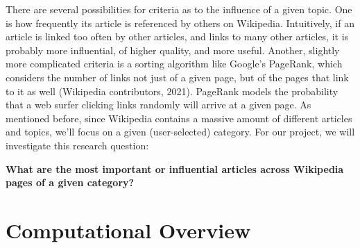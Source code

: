 \documentclass[fontsize=11pt]{article}
\begin{document}
There are several possibilities for criteria as to the influence of a given topic. One is how frequently its article is referenced by others on Wikipedia. Intuitively, if an article is linked too often by other articles, and links to many other articles, it is probably more influential, of higher quality, and more useful. Another, slightly more complicated criteria is a sorting algorithm like Google's PageRank, which considers the number of links not just of a given page, but of the pages that link to it as well (Wikipedia contributors, 2021). PageRank models the probability that a web surfer clicking links randomly will arrive at a given page. As mentioned before, since Wikipedia contains a massive amount of different articles and topics, we'll focus on a given (user-selected) category. For our project, we will investigate this research question:

\noindent \textbf{What are the most important or influential articles across Wikipedia pages of a given category?}

\section{Computational Overview}
\end{document}
